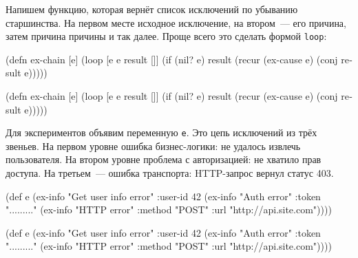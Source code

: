 Напишем функцию, которая вернёт список исключений по убыванию
старшинства. На первом месте исходное исключение, на втором~--- его причина, затем
причина причины и так далее. Проще всего это сделать формой \verb|loop|:


\ifx\devicetype\mobile

\begin{english}
  \begin{clojure}
(defn ex-chain [e]
  (loop [e e
         result []]
    (if (nil? e)
      result
      (recur (ex-cause e)
        (conj result e)))))
  \end{clojure}
\end{english}

\else

\begin{english}
  \begin{clojure}
(defn ex-chain [e]
  (loop [e e
         result []]
    (if (nil? e)
      result
      (recur (ex-cause e) (conj result e)))))
  \end{clojure}
\end{english}

\fi

Для экспериментов объявим переменную \verb|e|. Это цепь исключений из трёх
звеньев. На первом уровне ошибка бизнес-логики: не удалось извлечь
пользователя. На втором уровне проблема с авторизацией: не хватило прав
доступа. На третьем~--- ошибка транспорта: HTTP-запрос вернул статус 403.

\label{e-sample}

\ifx\devicetype\mobile

\begin{english}
  \begin{clojure}
(def e
  (ex-info
   "Get user info error"
   {:user-id 42}
   (ex-info
     "Auth error"
     {:token "........."}
     (ex-info
       "HTTP error"
       {:method "POST"
        :url "http://api.site.com"}))))
  \end{clojure}
\end{english}

\else

\begin{english}
  \begin{clojure}
(def e
  (ex-info
   "Get user info error"
   {:user-id 42}
   (ex-info "Auth error"
            {:token "........."}
            (ex-info "HTTP error"
                     {:method "POST"
                      :url "http://api.site.com"}))))
  \end{clojure}
\end{english}

